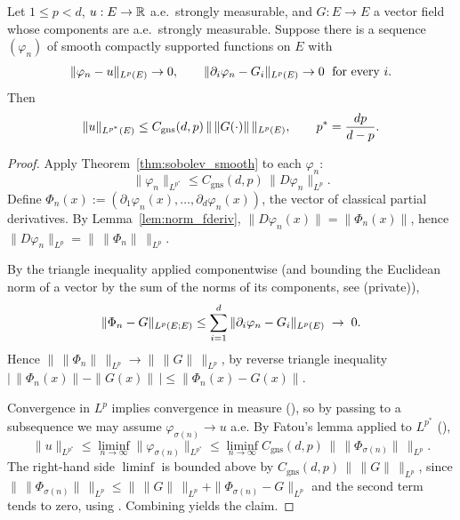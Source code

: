 \begin{theorem}
\label{thm:sobolev_of_approx}
\leanok
{}
Let $1 \le p < d$, $u : E \to \mathbb{R}$ a.e.\ strongly measurable, and $G : E \to E$
a vector field whose components are a.e.\ strongly measurable. Suppose there
is a sequence $(\varphi_n)$ of smooth compactly supported functions on $E$
with
\begin{equation*}
  \|\varphi_n - u\|_{L^{p}(E)} \to 0, \qquad
  \|\partial_i\varphi_n - G_i\|_{L^{p}(E)} \to 0 \;\text{ for every } i.
\end{equation*}
Then
\begin{equation*}
  \|u\|_{L^{p^*}(E)} \le C_{\mathrm{gns}}(d,p)\,\|\,\|G(\cdot)\|\,\|_{L^{p}(E)},
  \qquad p^* = \frac{dp}{d-p}.
\end{equation*}
\end{theorem}

\begin{proof}
\leanok
{}

Apply Theorem~\ref{thm:sobolev_smooth} to each $\varphi_n$:
\begin{equation*}
  \|\varphi_n\|_{L^{p^*}} \le C_{\mathrm{gns}}(d,p)\,\|D\varphi_n\|_{L^p}.
\end{equation*}
Define $\Phi_n(x) := (\partial_1\varphi_n(x),\ldots,\partial_d\varphi_n(x))$,
the vector of classical partial derivatives. By Lemma~\ref{lem:norm_fderiv},
$\|D\varphi_n(x)\| = \|\Phi_n(x)\|$, hence $\|D\varphi_n\|_{L^p} = \|\,\|\Phi_n\|\,\|_{L^p}$.

By the triangle inequality applied componentwise (and bounding the Euclidean
norm of a vector by the sum of the norms of its components, see
 (private)),
\begin{equation*}
  \|\Phi_n - G\|_{L^p(E; E)}
   \le \sum_{i=1}^d \|\partial_i\varphi_n - G_i\|_{L^{p}(E)} \;\to\; 0.
\end{equation*}
Hence $\|\,\|\Phi_n\|\,\|_{L^p} \to \|\,\|G\|\,\|_{L^p}$, by reverse triangle
inequality $|\,\|\Phi_n(x)\| - \|G(x)\|\,| \le \|\Phi_n(x) - G(x)\|$.

Convergence in $L^p$ implies convergence in measure
(), so by passing to a
subsequence we may assume $\varphi_{\sigma(n)} \to u$ a.e. By Fatou's lemma
applied to $L^{p^*}$ (),
\begin{equation*}
  \|u\|_{L^{p^*}}
   \le \liminf_{n\to\infty} \|\varphi_{\sigma(n)}\|_{L^{p^*}}
   \le \liminf_{n\to\infty} C_{\mathrm{gns}}(d,p)\,\|\,\|\Phi_{\sigma(n)}\|\,\|_{L^p}.
\end{equation*}
The right-hand side $\liminf$ is bounded above by $C_{\mathrm{gns}}(d,p)\,\|
\,\|G\|\,\|_{L^p}$, since $\|\,\|\Phi_{\sigma(n)}\|\,\|_{L^p} \le \|\,\|G\|\,\|_{L^p}
+ \|\Phi_{\sigma(n)} - G\|_{L^p}$ and the second term tends to zero, using
. Combining yields the
claim.
\end{proof}

